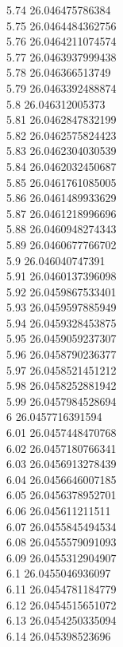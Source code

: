 {5.74	26.046475786384\\
5.75	26.0464484362756\\
5.76	26.0464211074574\\
5.77	26.0463937999438\\
5.78	26.046366513749\\
5.79	26.0463392488874\\
5.8	26.046312005373\\
5.81	26.0462847832199\\
5.82	26.0462575824423\\
5.83	26.0462304030539\\
5.84	26.0462032450687\\
5.85	26.0461761085005\\
5.86	26.0461489933629\\
5.87	26.0461218996696\\
5.88	26.0460948274343\\
5.89	26.0460677766702\\
5.9	26.046040747391\\
5.91	26.0460137396098\\
5.92	26.0459867533401\\
5.93	26.0459597885949\\
5.94	26.0459328453875\\
5.95	26.0459059237307\\
5.96	26.0458790236377\\
5.97	26.0458521451212\\
5.98	26.0458252881942\\
5.99	26.0457984528694\\
6	26.0457716391594\\
6.01	26.0457448470768\\
6.02	26.0457180766341\\
6.03	26.0456913278439\\
6.04	26.0456646007185\\
6.05	26.0456378952701\\
6.06	26.045611211511\\
6.07	26.0455845494534\\
6.08	26.0455579091093\\
6.09	26.0455312904907\\
6.1	26.0455046936097\\
6.11	26.0454781184779\\
6.12	26.0454515651072\\
6.13	26.0454250335094\\
6.14	26.045398523696\\
}
